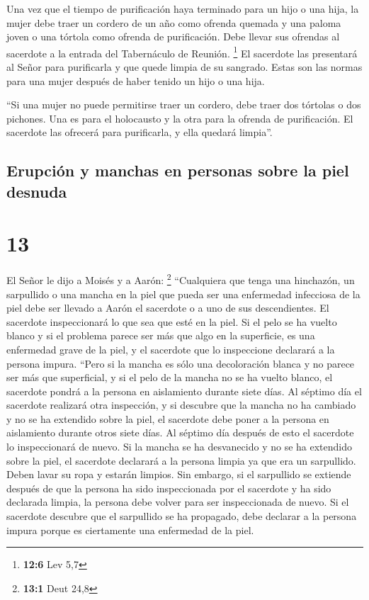  Una vez que el tiempo de purificación haya terminado para
un hijo o una hija, la mujer debe traer un cordero de un año como
ofrenda quemada y una paloma joven o una tórtola como ofrenda de
purificación. Debe llevar sus ofrendas al sacerdote a la entrada del
Tabernáculo de Reunión. \footnote{\textbf{12:6} Lev 5,7} 
El sacerdote las presentará al Señor para purificarla y que quede limpia
de su sangrado. Estas son las normas para una mujer después de haber
tenido un hijo o una hija.

 ``Si una mujer no puede permitirse traer un cordero, debe
traer dos tórtolas o dos pichones. Una es para el holocausto y la otra
para la ofrenda de purificación. El sacerdote las ofrecerá para
purificarla, y ella quedará limpia''.

\hypertarget{erupciuxf3n-y-manchas-en-personas-sobre-la-piel-desnuda}{%
\subsection{Erupción y manchas en personas sobre la piel
desnuda}\label{erupciuxf3n-y-manchas-en-personas-sobre-la-piel-desnuda}}

\hypertarget{section-12}{%
\section{13}\label{section-12}}

 El Señor le dijo a Moisés y a Aarón: \footnote{\textbf{13:1}
  Deut 24,8}  ``Cualquiera que tenga una hinchazón, un
sarpullido o una mancha en la piel que pueda ser una enfermedad
infecciosa de la piel debe ser llevado a Aarón el sacerdote o a uno de
sus descendientes.  El sacerdote inspeccionará lo que sea
que esté en la piel. Si el pelo se ha vuelto blanco y si el problema
parece ser más que algo en la superficie, es una enfermedad grave de la
piel, y el sacerdote que lo inspeccione declarará a la persona impura.
 ``Pero si la mancha es sólo una decoloración blanca y no
parece ser más que superficial, y si el pelo de la mancha no se ha
vuelto blanco, el sacerdote pondrá a la persona en aislamiento durante
siete días.  Al séptimo día el sacerdote realizará otra
inspección, y si descubre que la mancha no ha cambiado y no se ha
extendido sobre la piel, el sacerdote debe poner a la persona en
aislamiento durante otros siete días.  Al séptimo día
después de esto el sacerdote lo inspeccionará de nuevo. Si la mancha se
ha desvanecido y no se ha extendido sobre la piel, el sacerdote
declarará a la persona limpia ya que era un sarpullido. Deben lavar su
ropa y estarán limpios.  Sin embargo, si el sarpullido se
extiende después de que la persona ha sido inspeccionada por el
sacerdote y ha sido declarada limpia, la persona debe volver para ser
inspeccionada de nuevo.  Si el sacerdote descubre que el
sarpullido se ha propagado, debe declarar a la persona impura porque es
ciertamente una enfermedad de la piel.

